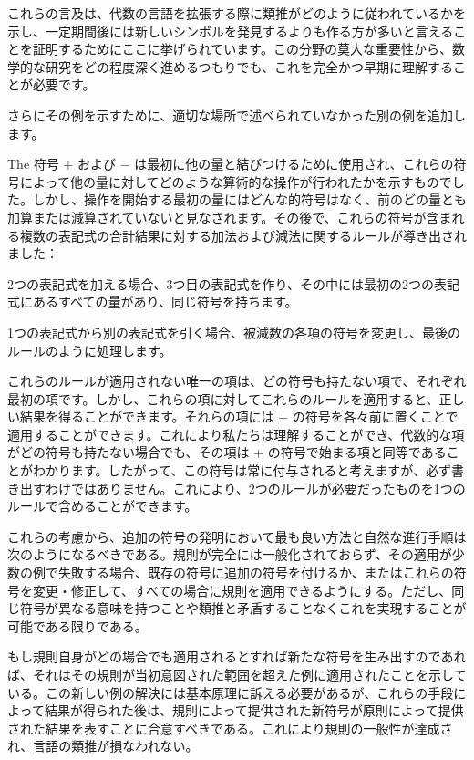 \documentclass[a4paper,11pt,openany]{ltjsbook}
\begin{document}
これらの言及は、代数の言語を拡張する際に類推がどのように従われているかを示し、一定期間後には新しいシンボルを発見するよりも作る方が多いと言えることを証明するためにここに挙げられています。この分野の莫大な重要性から、数学的な研究をどの程度深く進めるつもりでも、これを完全かつ早期に理解することが必要です。

さらにその例を示すために、適切な場所で述べられていなかった別の例を追加します。

The 符号 \(+\) および \(-\) は最初に他の量と結びつけるために使用され、これらの符号によって他の量に対してどのような算術的な操作が行われたかを示すものでした。しかし、操作を開始する最初の量にはどんな的符号はなく、前のどの量とも加算または減算されていないと見なされます。その後で、これらの符号が含まれる複数の表記式の合計結果に対する加法および減法に関するルールが導き出されました：

2つの表記式を加える場合、3つ目の表記式を作り、その中には最初の2つの表記式にあるすべての量があり、同じ符号を持ちます。

1つの表記式から別の表記式を引く場合、被減数の各項の符号を変更し、最後のルールのように処理します。

これらのルールが適用されない唯一の項は、どの符号も持たない項で、それぞれ最初の項です。しかし、これらの項に対してこれらのルールを適用すると、正しい結果を得ることができます。それらの項には \(+\) の符号を各々前に置くことで適用することができます。これにより私たちは理解することができ、代数的な項がどの符号も持たない場合でも、その項は \(+\) の符号で始まる項と同等であることがわかります。したがって、この符号は常に付与されると考えますが、必ず書き出すわけではありません。これにより、2つのルールが必要だったものを1つのルールで含めることができます。

これらの考慮から、追加の符号の発明において最も良い方法と自然な進行手順は次のようになるべきである。規則が完全には一般化されておらず、その適用が少数の例で失敗する場合、既存の符号に追加の符号を付けるか、またはこれらの符号を変更・修正して、すべての場合に規則を適用できるようにする。ただし、同じ符号が異なる意味を持つことや類推と矛盾することなくこれを実現することが可能である限りである。

もし規則自身がどの場合でも適用されるとすれば新たな符号を生み出すのであれば、それはその規則が当初意図された範囲を超えた例に適用されたことを示している。この新しい例の解決には基本原理に訴える必要があるが、これらの手段によって結果が得られた後は、規則によって提供された新符号が原則によって提供された結果を表すことに合意すべきである。これにより規則の一般性が達成され、言語の類推が損なわれない。
\end{document}

